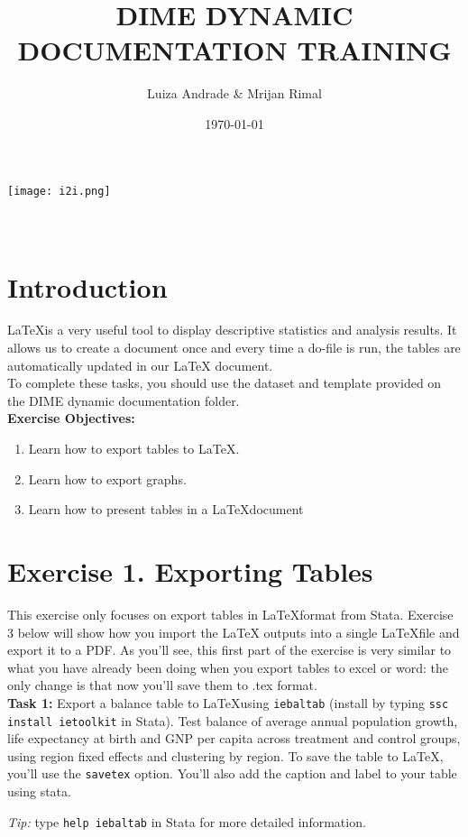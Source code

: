 \documentclass[12pts]{report}
\title{DIME DYNAMIC DOCUMENTATION TRAINING }
\author{Luiza Andrade \& Mrijan Rimal}
\date{\today}
\begin{document}
	

\makeatletter
\begin{titlepage}
	\begin{center}
		\texttt{[image: i2i.png]}\\[10ex]
		{\LARGE \bfseries  \@title }\\[2ex] 
		{\Large  \@author}\\[20ex] 
		{\large \@date}
	\end{center}
\end{titlepage}
\makeatother

\section*{Introduction}
\LaTeX\space is a very useful tool to display descriptive statistics and analysis results. It allows us to create a document once and every time a do-file is run, the tables are automatically updated in our LaTeX document. \\

To complete these tasks, you should use the dataset and template provided on the DIME dynamic documentation folder. \\

\textbf{Exercise Objectives:}
\begin{enumerate}
	\item Learn how to export tables to \LaTeX.
	\item Learn how to export graphs.
	\item Learn how to present tables in a \LaTeX document
\end{enumerate}

\section*{Exercise 1. Exporting Tables}
This exercise only focuses on export tables in \LaTeX \space format from Stata. Exercise 3 below will show how you import the LaTeX outputs into a single \LaTeX \space file and export it to a PDF. As you'll see, this first part of the exercise is very similar to what you have already been doing when you export tables to excel or word: the only change is that now you'll save them to .tex format. \\

\textbf{Task 1:}  Export a balance table to \LaTeX \space using \texttt{iebaltab} (install by typing \texttt{ssc install ietoolkit} in Stata). Test balance of average annual population growth, life expectancy at birth and GNP per capita across treatment and control groups, using region fixed effects and clustering by region. To save the table to \LaTeX, you'll use the \texttt{savetex} option. You'll also add the caption and label to your table using stata. 
\begin{center}
	\textcolor{BurntOrange}{\emph{Tip:} type \texttt{help iebaltab} in Stata for more detailed information.}
\end{center}
\end{document}
